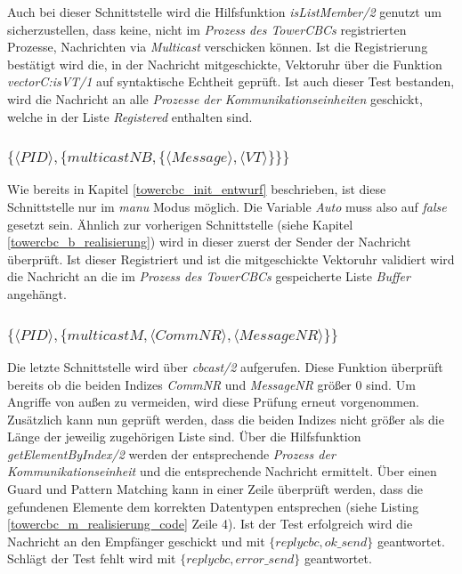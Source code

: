 Auch bei dieser Schnittstelle wird die Hilfsfunktion \textit{isListMember/2} genutzt um sicherzustellen, dass keine, nicht im \textit{Prozess des TowerCBCs} registrierten Prozesse, Nachrichten via \textit{Multicast} verschicken können. Ist die Registrierung bestätigt wird die, in der Nachricht mitgeschickte, Vektoruhr über die Funktion \textit{vectorC:isVT/1} auf syntaktische Echtheit geprüft. Ist auch dieser Test bestanden, wird die Nachricht an alle \textit{Prozesse der Kommunikationseinheiten} geschickt, welche in der Liste \textit{Registered} enthalten sind. 

\subsubsection{$\{\langle PID\rangle,\{multicastNB,\{\langle Message\rangle,\langle VT\rangle\}\}\}$} \label{towercbc_nb_realisierung}

Wie bereits in Kapitel \ref{towercbc_init_entwurf} beschrieben, ist diese Schnittstelle nur im \textit{manu} Modus möglich. Die Variable \textit{Auto} muss also auf \textit{false} gesetzt sein. Ähnlich zur vorherigen Schnittstelle (siehe Kapitel \ref{towercbc_b_realisierung}) wird in dieser zuerst der Sender der Nachricht überprüft. Ist dieser Registriert und ist die mitgeschickte Vektoruhr validiert wird die Nachricht an die im \textit{Prozess des TowerCBCs} gespeicherte Liste \textit{Buffer} angehängt.

\subsubsection{$\{\langle PID\rangle,\{multicastM,\langle CommNR\rangle,\langle MessageNR\rangle\}\}$} \label{towercbc_m_realisierung}

Die letzte Schnittstelle wird über \textit{cbcast/2} aufgerufen. Diese Funktion überprüft bereits ob die beiden Indizes \textit{CommNR} und \textit{MessageNR} größer 0 sind. Um Angriffe von außen zu vermeiden, wird diese Prüfung erneut vorgenommen. Zusätzlich kann nun geprüft werden, dass die beiden Indizes nicht größer als die Länge der jeweilig zugehörigen Liste sind. Über die Hilfsfunktion \textit{getElementByIndex/2} werden der entsprechende \textit{Prozess der Kommunikationseinheit} und die entsprechende Nachricht ermittelt. Über einen Guard und Pattern Matching kann in einer Zeile überprüft werden, dass die gefundenen Elemente dem korrekten Datentypen entsprechen (siehe Listing \ref{towercbc_m_realisierung_code} Zeile 4).
Ist der Test erfolgreich wird die Nachricht an den Empfänger geschickt und mit $\{replycbc, ok\_send\}$ geantwortet. Schlägt der Test fehlt wird mit $\{replycbc, error\_send\}$ geantwortet.

